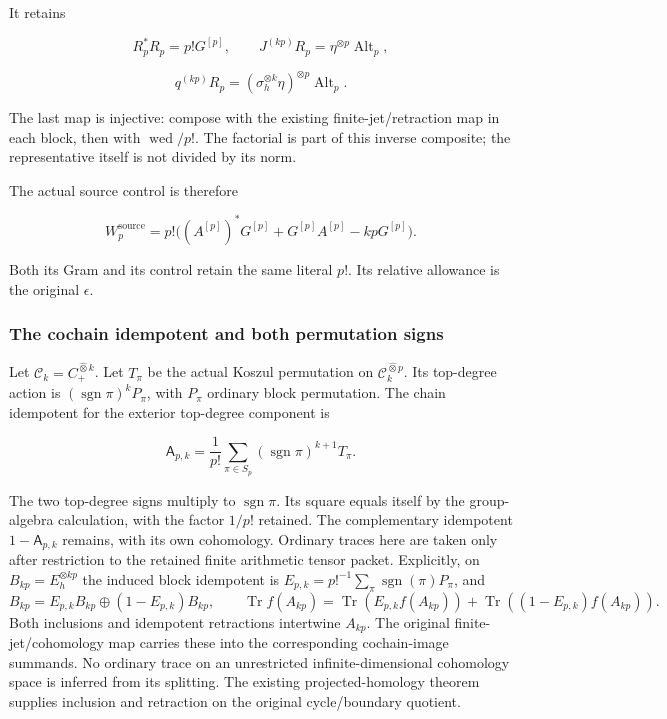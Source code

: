 It retains

\[
R_p^*R_p=p!G^{[p]},\qquad
J^{(kp)}R_p=\eta^{\otimes p}\operatorname{Alt}_p,
\]

\[
q^{(kp)}R_p=(\sigma_h^{\otimes k}\eta)^{\otimes p}
             \operatorname{Alt}_p.
\]

The last map is injective: compose with the existing
finite-jet/retraction map in each block, then with
\(\operatorname{wed}/p!\). The factorial is part of this inverse
composite; the representative itself is not divided by its norm.

The actual source control is therefore

\[
W_p^{\mathrm{source}}=p!\bigl((A^{[p]})^*G^{[p]}+G^{[p]}A^{[p]}-kpG^{[p]}\bigr).
\]

Both its Gram and its control retain the same literal \(p!\). Its
relative allowance is the original \(\epsilon\).

\subsubsection{The cochain idempotent and both permutation
signs}\label{exttrace-the-cochain-idempotent-and-both-permutation-signs}

Let \(\mathcal C_k=C_+^{\widehat\otimes k}\). Let \(T_\pi\) be the
actual Koszul permutation on \(\mathcal C_k^{\widehat\otimes p}\). Its
top-degree action is \((\operatorname{sgn}\pi)^kP_\pi\), with \(P_\pi\)
ordinary block permutation. The chain idempotent for the exterior
top-degree component is

\[
\boxed{
\mathsf A_{p,k}
=\frac1{p!}\sum_{\pi\in S_p}
 (\operatorname{sgn}\pi)^{k+1}T_\pi.
}
\]

The two top-degree signs multiply to \(\operatorname{sgn}\pi\). Its
square equals itself by the group-algebra calculation, with the factor
\(1/p!\) retained. The complementary idempotent \(1-\mathsf A_{p,k}\)
remains, with its own cohomology. Ordinary traces here are taken only
after restriction to the retained finite arithmetic tensor packet.
Explicitly, on \(B_{kp}=E_h^{\otimes kp}\) the induced block idempotent is
\(E_{p,k}=p!^{-1}\sum_\pi\operatorname{sgn}(\pi)P_\pi\), and
\[
B_{kp}=E_{p,k}B_{kp}\oplus(1-E_{p,k})B_{kp},\qquad
\operatorname{Tr}f(A_{kp})
=\operatorname{Tr}(E_{p,k}f(A_{kp}))
+\operatorname{Tr}((1-E_{p,k})f(A_{kp})).
\]
Both inclusions and idempotent retractions intertwine \(A_{kp}\).
The original finite-jet/cohomology map carries these into the corresponding
cochain-image summands. No ordinary trace on an unrestricted
infinite-dimensional cohomology space is inferred from its splitting.
The existing
projected-homology theorem supplies inclusion and retraction on the
original cycle/boundary quotient.

